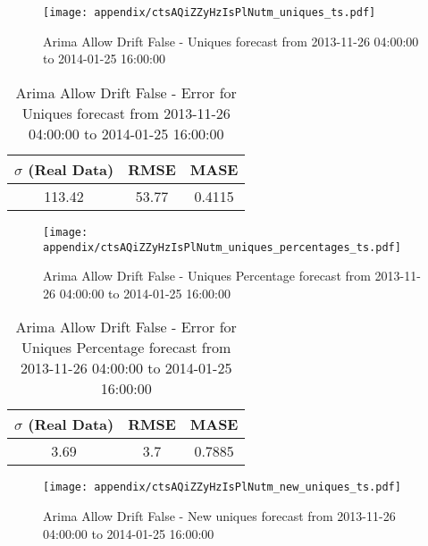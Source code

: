 \begin{figure}[H] \begin{center} \leavevmode
\texttt{[image: appendix/ctsAQiZZyHzIsPlNutm\_uniques\_ts.pdf]} \caption{
Arima Allow Drift False - Uniques forecast from 2013-11-26 04:00:00 to 2014-01-25 16:00:00} \label{fig:appendix/ctsAQiZZyHzIsPlNutm_uniques_ts.pdf} \end{center}
\end{figure}

\begin{table}[H]
\centering
\footnotesize
\begin{tabular}{ccc}
$\sigma$ (Real Data) & RMSE & MASE   \\ \hline
113.42 & 53.77 & 0.4115 \\
\end{tabular}

\vspace{0.5cm}

\caption{
Arima Allow Drift False - Error for Uniques forecast from 2013-11-26 04:00:00 to 2014-01-25 16:00:00}
\end{table}

\begin{figure}[H] \begin{center} \leavevmode
\texttt{[image: appendix/ctsAQiZZyHzIsPlNutm\_uniques\_percentages\_ts.pdf]} \caption{
Arima Allow Drift False - Uniques Percentage forecast from 2013-11-26 04:00:00 to 2014-01-25 16:00:00} \label{fig:appendix/ctsAQiZZyHzIsPlNutm_uniques_percentages_ts.pdf} \end{center}
\end{figure}

\begin{table}[H]
\centering
\footnotesize
\begin{tabular}{ccc}
$\sigma$ (Real Data) & RMSE & MASE   \\ \hline
3.69 & 3.7 & 0.7885 \\
\end{tabular}

\vspace{0.5cm}

\caption{
Arima Allow Drift False - Error for Uniques Percentage forecast from 2013-11-26 04:00:00 to 2014-01-25 16:00:00}
\end{table}

\begin{figure}[H] \begin{center} \leavevmode
\texttt{[image: appendix/ctsAQiZZyHzIsPlNutm\_new\_uniques\_ts.pdf]} \caption{
Arima Allow Drift False - New uniques forecast from 2013-11-26 04:00:00 to 2014-01-25 16:00:00} \label{fig:appendix/ctsAQiZZyHzIsPlNutm_new_uniques_ts.pdf} \end{center}
\end{figure}

